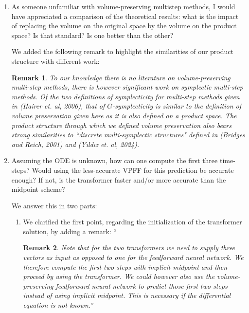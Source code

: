 \documentclass{article}
\newtheorem*{rmrk*}{Remark}
\begin{document}
\begin{enumerate}
{        \begin{itemize}
        \item[1. ] in many cases we need to recover the dynamics of our system from data alone (this is known as ``non-intrusive reduced order modeling"), 
        \item[2. ] if the big system exhibits specific structure (such as volume-preservation) it is often crucial to also respect this structure in the reduced model''.  
        \end{itemize}


        Regarding the second point of this remark, i.e. ``accurately introducing and describing the volume-preserving properties of the author's architecture'', we refer to our answer to the third remark below.
    }

    \item As someone unfamiliar with volume-preserving multistep methods, I would have appreciated a comparison of the theoretical results: what is the impact of replacing the volume on the original space by the volume on the product space? Is that standard? Is one better than the other?
        {\color{mred} We added the following remark to highlight the similarities of our product structure with different work:
        
        \begin{rmrk*} 
            To our knowledge there is no literature on volume-preserving multi-step methods, there is however significant work on \textit{symplectic multi-step methods}. Of the two definitions of symplecticity for multi-step methods given in (Hairer et. al, 2006), that of \textit{\(G\)-symplecticity} is similar to the definition of volume preservation given here as it is also defined on a product space. The product structure through which we defined volume preservation also bears strong similarities to ``discrete multi-symplectic structures" defined in (Bridges and Reich, 2001) and (Y{\i}ld{\i}z et. al, 2024). 
        \end{rmrk*}

        }
    \item Assuming the ODE is unknown, how can one compute the first three time-steps? Would using the less-accurate VPFF for this prediction be accurate enough? If not, is the transformer faster and/or more accurate than the midpoint scheme?
        {\color{mred}
        We answer this in two parts:
        \begin{enumerate}
            \item We clarified the first point, regarding the initialization of the transformer solution, by adding a remark:
                ``\begin{rmrk*} Note that for the two transformers we need to supply three vectors as input as opposed to one for the feedforward neural network. We therefore compute the first two steps with implicit midpoint and then proceed by using the transformer. We could however also use the volume-preserving feedforward neural network to predict those first two steps instead of using implicit midpoint. This is necessary if the differential equation is not known.''\end{rmrk*}


\end{enumerate}}
\end{enumerate}
\end{document}
